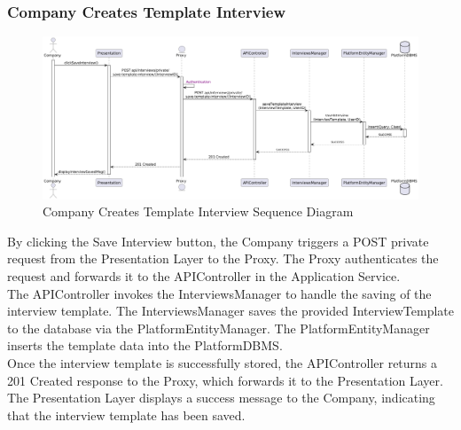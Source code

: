 \subsubsection*{Company Creates Template Interview}
\begin{figure}[H]
    \centering
    \includegraphics[width=\linewidth]{Latex/Images/DD/SequenceDiagrams/11CompanyCreateTemplateInterview.png}
    \caption{Company Creates Template Interview Sequence Diagram}
    \label{fig:compcretempint}
\end{figure}
By clicking the Save Interview button, the Company triggers a POST private request from the Presentation Layer to the Proxy. The Proxy authenticates the request and forwards it to the APIController in the Application Service.\\
The APIController invokes the InterviewsManager to handle the saving of the interview template. The InterviewsManager saves the provided InterviewTemplate to the database via the PlatformEntityManager. The PlatformEntityManager inserts the template data into the PlatformDBMS.\\
Once the interview template is successfully stored, the APIController returns a 201 Created response to the Proxy, which forwards it to the Presentation Layer. The Presentation Layer displays a success message to the Company, indicating that the interview template has been saved.

